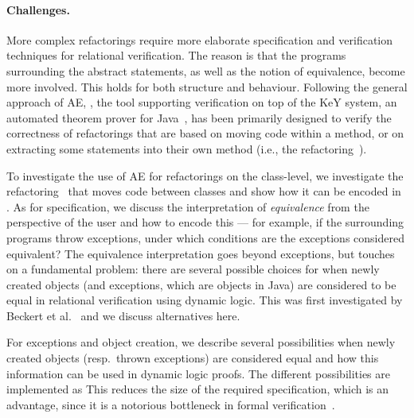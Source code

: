 \paragraph{Challenges.}
More complex refactorings require more elaborate specification and verification techniques for relational verification. 
The reason is that the programs surrounding the abstract statements, as well as the notion of equivalence, become more involved.
This holds for both structure and behaviour.
Following the general approach of AE, \Refinity{} \cite{steinhoefel:ae}, the tool supporting verification on top of the KeY system, an automated theorem prover for Java~\cite{DBLP:conf/aplas/Steinhofel20},
has been primarily designed to verify the correctness of refactorings that are based on moving code within a method, or on extracting some statements into their own method (i.e., the  refactoring~\cite[p. 106]{fowler:refactoring2nd}).

To investigate the use of AE for refactorings on the class-level, we investigate the  refactoring~\cite[p. 189]{fowler:refactoring2nd} that moves code between classes and show how it can be encoded in \Refinity{}.
As for specification, we discuss the interpretation of \textit{equivalence} from the perspective of the user and how to encode this --- for example, if the surrounding programs throw exceptions, under which conditions are the exceptions considered equivalent?
The equivalence interpretation goes beyond exceptions, but touches on a fundamental problem:
there are several possible choices for when newly created objects (and exceptions, which are objects in Java) are considered to be equal in relational verification using dynamic logic.
This was first investigated by Beckert et al.~\cite{DBLP:conf/lopstr/BeckertBKSSU13} and we discuss alternatives here.


For exceptions and object creation, we describe several possibilities when newly created objects (resp.\ thrown exceptions) are considered equal
and how this information can be used in dynamic logic proofs. The different possibilities are implemented as 
This reduces the size of the required specification, which is an advantage, since it is a notorious bottleneck in formal verification~\cite{DBLP:journals/corr/abs-1211-6186,DBLP:series/lncs/HahnleH19}.



